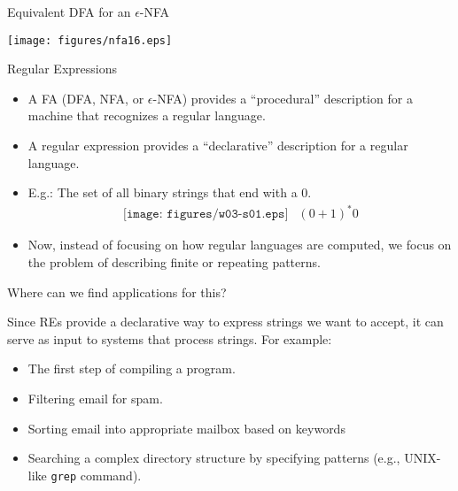 \documentclass{prosper}%
\newcommand{\enfa}{{$\epsilon$-NFA}}
\begin{document}
\begin{slide}{Equivalent DFA for an \enfa}
\begin{center}
\texttt{[image: figures/nfa16.eps]}
\end{center}
\end{slide}

\begin{slide}{Regular Expressions}
\begin{itemize}
\item A FA (DFA, NFA, or \enfa) provides a ``procedural'' description for a machine that recognizes a regular language.
\item A regular expression provides a ``declarative'' description for a regular language.
\item E.g.: The set of all binary strings that end with a 0.
\[
\begin{array}{cc}
\texttt{[image: figures/w03-s01.eps]}
&
(0+1)^*0
\end{array}
\]
\item Now, instead of focusing on how regular languages are computed, we focus on the problem of describing finite or repeating patterns.
\end{itemize}
\end{slide}

\begin{slide}{Where can we find applications for this?}

Since REs provide a declarative way to express strings we want to accept, it can serve as input to systems that process strings. For example:
\begin{itemize}
\item The first step of compiling a program.
\item Filtering email for spam.
\item Sorting email into appropriate mailbox based on keywords
\item Searching a complex directory structure by specifying patterns (e.g., UNIX-like {\tt grep} command).
\end{itemize}
\end{slide}
\end{document}
